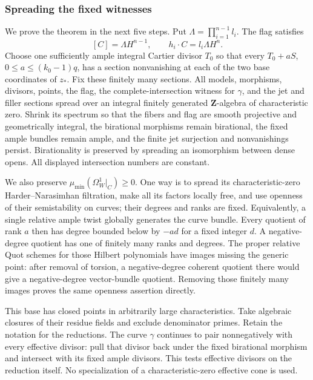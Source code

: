 \subsubsection{Spreading the fixed witnesses}

We prove the theorem in the next five steps. Put
$\Lambda=\prod_{i=1}^{n-1}l_i$. The flag satisfies
\begin{equation}\label{common:flag-degrees}
 [C]=\Lambda H^{n-1},\qquad h_i\cdot C=l_i\Lambda H^n.
\end{equation}
Choose one sufficiently ample integral Cartier divisor $T_0$ so
that every $T_0+aS$, $0\le a\le(k_0-1)q$, has a section
nonvanishing at each of the two base coordinates of $z_*$.
Fix these finitely many sections. All models, morphisms, divisors,
points, the flag, the complete-intersection witness for $\gamma$,
and the jet and filler sections spread over an integral finitely
generated $\mathbf Z$-algebra of characteristic zero. Shrink its
spectrum so that the fibers and flag are smooth projective and
geometrically integral, the birational morphisms remain birational,
the fixed ample bundles remain ample, and the finite jet
surjection and nonvanishings persist. Birationality is preserved
by spreading an isomorphism between dense opens. All displayed
intersection numbers are constant.

We also preserve $\mu_{\min}(\Omega_W^1|_C)\ge0$.
One way is to spread its characteristic-zero Harder--Narasimhan
filtration, make all its factors locally free, and use openness
of their semistability on curves; their degrees and ranks are
fixed. Equivalently, a single relative ample twist globally
generates the curve bundle. Every quotient of rank $a$ then has
degree bounded below by $-ad$ for a fixed integer $d$.
A negative-degree quotient has one of finitely many ranks and
degrees. The proper relative Quot schemes for those Hilbert
polynomials have images missing the generic point: after removal
of torsion, a negative-degree coherent quotient there would
give a negative-degree vector-bundle quotient. Removing those
finitely many images proves the same openness assertion directly.

This base has closed points in arbitrarily large characteristics.
Take algebraic closures of their residue fields and exclude
denominator primes. Retain the notation for the reductions.
The curve $\gamma$ continues to pair nonnegatively with every
effective divisor: pull that divisor back under the fixed
birational morphism and intersect with its fixed ample divisors.
This tests effective divisors on the reduction itself. No
specialization of a characteristic-zero effective cone is used.

